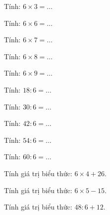 \begin{ex}
Tính: $6 \times 3 = \dots$
\end{ex}

\begin{ex}
Tính: $6 \times 6 = \dots$
\end{ex}

\begin{ex}
Tính: $6 \times 7 = \dots$
\end{ex}

\begin{ex}
Tính: $6 \times 8 = \dots$
\end{ex}

\begin{ex}
Tính: $6 \times 9 = \dots$
\end{ex}

\begin{ex}
Tính: $18 : 6 = \dots$
\end{ex}

\begin{ex}
Tính: $30 : 6 = \dots$
\end{ex}

\begin{ex}
Tính: $42 : 6 = \dots$
\end{ex}

\begin{ex}
Tính: $54 : 6 = \dots$
\end{ex}

\begin{ex}
Tính: $60 : 6 = \dots$
\end{ex}

\begin{ex}
Tính giá trị biểu thức: $6 \times 4 + 26$.
\end{ex}

\begin{ex}
Tính giá trị biểu thức: $6 \times 5 - 15$.
\end{ex}

\begin{ex}
Tính giá trị biểu thức: $48 : 6 + 12$.
\end{ex}


